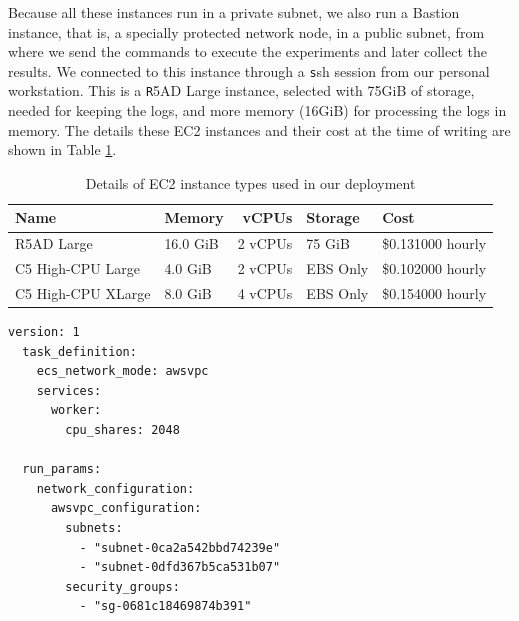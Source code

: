 \documentclass[review]{elsarticle}
\begin{document}
Because all these instances run in a private subnet, we also run a
Bastion instance, that is, a specially protected network node, in a
public subnet, from where we send the commands to execute the
experiments and later collect the results. We connected to this
instance through a {\texttt ssh} session from our personal
workstation. This is a {\texttt R5AD Large} instance, selected with
75GiB of storage, needed for keeping the logs, and more memory (16GiB)
for processing the logs in memory. The details these EC2 instances and
their cost at the time of writing are shown in Table \ref{tab:ec2}.


\begin{table}[h!tbp]
  \small
  \caption{Details of EC2 instance types used in our deployment}
  \label{tab:ec2} 
  \centering
  \small
  \begin{tabular}{|l|l|r|l|l|}
    \hline
    Name & Memory & vCPUs & Storage  & Cost \\ \hline
    R5AD Large	&	16.0 GiB	& 2 vCPUs	& 75 GiB 	& \$0.131000 hourly \\ \hline
    C5 High-CPU Large	&	4.0 GiB	& 2 vCPUs	& EBS Only 	& \$0.102000 hourly \\ \hline
    C5 High-CPU XLarge	&	8.0 GiB	& 4 vCPUs	& EBS Only 	& \$0.154000 hourly \\ \hline
  \end{tabular}
\end{table}

\begin{lstlisting}[caption=ecs-params.yml , label=code:ecs]
  version: 1
  task_definition:
    ecs_network_mode: awsvpc
    services:
      worker:
        cpu_shares: 2048
  
  run_params:
    network_configuration:
      awsvpc_configuration:
        subnets:
          - "subnet-0ca2a542bbd74239e"
          - "subnet-0dfd367b5ca531b07"
        security_groups:
          - "sg-0681c18469874b391"  
\end{lstlisting}
\end{document}
